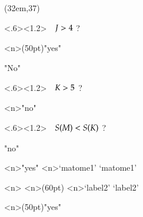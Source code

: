 \documentclass[a4j,fleqn]{jarticle}
\begin{document}
\hakosyokika
\begin{caprm}
\begin{nidan}{29em}{%
\small
{}
\noindent
\begin{caprm}
\begin{nagarezu}[.45](32em,37\baselineskip)%
  \sitahe%
  \sitahe
  \sitahe[label1]%
  \begin{handan}<.6><1.2>{　$\strut J>4$ ?　}%
    \begin{migibunki}%
      \migihe<n>(50pt)"yes"%
      \sitahe%
    \end{migibunki}%
    \begin{sitabunki}%
      \sitahe"No"
    \sitahe[label2]%
    \begin{handan}<.6><1.2>{　$\strut K>5$ ?　}%
    \begin{hidaribunki}%
      \hidarihe<n>"no"%
      \sitahe
        \begin{handan}<.6><1.2>{　$\strut S(M)<S(K)$ ?　}%
          \begin{sitabunki}%
            \sitahe"no"%
            \sitahe[matome1]%
            \pushcurP
          \end{sitabunki}%
          \begin{migibunki}%
            \migihe<n>"yes"%
            \sitahe<n>`matome1'
            \hidarihe`matome1'
          \end{migibunki}%
        \end{handan}%
        \popcurP
        \sitahe<n>%
        \hidarihe<n>(60pt)%
        \uehe<n>`label2'%
        \migihe`label2'%
      \end{hidaribunki}%
      \begin{migibunki}%
        \migihe<n>(50pt)"yes"%
        \sitahe

\end{migibunki}
\end{handan}
\end{sitabunki}
\end{handan}
\end{nagarezu}
\end{caprm}}
\end{nidan}
\end{caprm}
\end{document}
